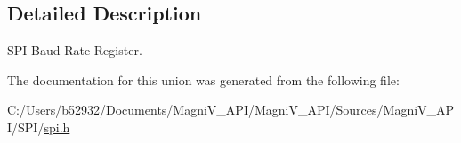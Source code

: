 \subsection{Detailed Description}
S\+P\+I Baud Rate Register. 

The documentation for this union was generated from the following file\+:\begin{DoxyCompactItemize}
\item 
C\+:/\+Users/b52932/\+Documents/\+Magni\+V\+\_\+\+A\+P\+I/\+Magni\+V\+\_\+\+A\+P\+I/\+Sources/\+Magni\+V\+\_\+\+A\+P\+I/\+S\+P\+I/\hyperlink{spi_8h}{spi.\+h}\end{DoxyCompactItemize}
